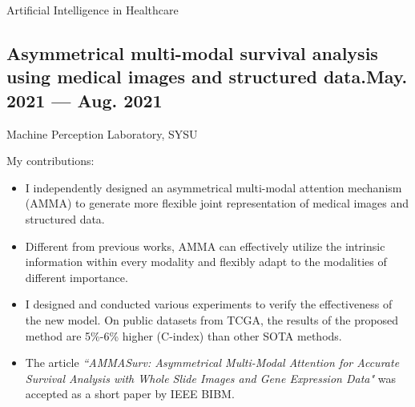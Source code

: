 \documentclass[a4,11pt]{article}
\newcommand{\subtext}[1]{
#1\par\vspace{-0.2cm}}
\begin{document}


\centerline{\textcolor{UI_blue}{Artificial Intelligence in Healthcare}}
\vspace {6pt}
\subsection*{Asymmetrical multi-modal survival analysis using medical images and structured data.\hfill May. 2021 --- Aug. 2021} 
\subtext{Machine Perception Laboratory, SYSU }
\vspace {6pt}
My contributions:
    \begin{itemize}[topsep = 0 pt, itemsep = 0 pt, parsep = 1 pt]
       \item I independently designed an asymmetrical multi-modal attention mechanism (AMMA) to generate more flexible joint representation of medical images and structured data. 
		\item Different from previous works, AMMA can effectively utilize the intrinsic information within every modality and flexibly adapt to the modalities of different importance.
		\item I designed and conducted various experiments to verify the effectiveness of the new model.  On public datasets from TCGA, the results of the proposed method are 5\%-6\% higher (C-index) than other SOTA methods. 
        \item The article \textit{``AMMASurv: Asymmetrical Multi-Modal Attention for Accurate Survival Analysis with Whole Slide Images and Gene Expression Data"} was accepted as a short paper by IEEE BIBM.
    \end{itemize}
\end{document}
